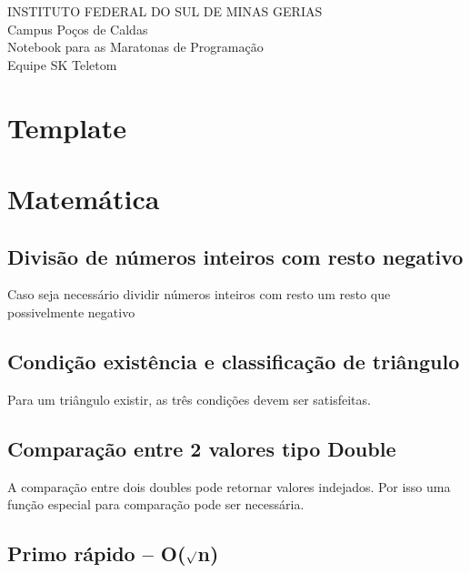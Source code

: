 \documentclass[a4paper,12pt]{article}
\begin{document}
\begin{center}
\Large{INSTITUTO FEDERAL DO SUL DE MINAS GERIAS}\\
\large{Campus Poços de Caldas}\\
\vspace{10cm}
\Large{Notebook para as Maratonas de Programação}\\
\large{Equipe SK Teletom}
\end{center}

\newpage
\tableofcontents
\thispagestyle{empty}

\newpage
\section{Template}

\newpage
\section{Matemática}
\subsection{Divisão de números inteiros com resto negativo}

Caso seja necessário dividir números inteiros com resto um resto que possivelmente negativo


\subsection{Condição existência e classificação de triângulo}

Para um triângulo existir, as três condições devem ser satisfeitas.


\subsection{Comparação entre 2 valores tipo Double}

A comparação entre dois doubles pode retornar valores indejados. Por isso uma função especial para comparação pode ser necessária.


\subsection{Primo rápido – O($\surd$n)}
\end{document}
